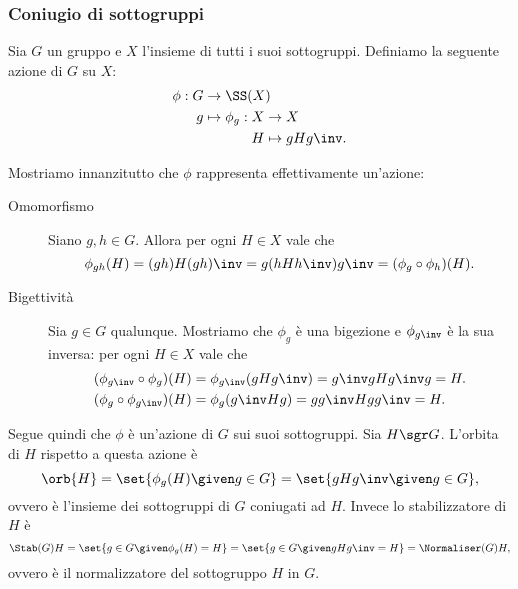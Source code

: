 \subsubsection{Coniugio di sottogruppi}
Sia $G$ un gruppo e $X$ l'insieme di tutti i suoi sottogruppi. Definiamo la seguente azione di $G$ su $X$:
\begin{align*}
    \phi : G &\to \SS(X)\\
           g &\mapsto 
    \begin{alignedat}[t]{1}
        \phi_g : X &\to X\\
                 H &\mapsto gHg\inv.
    \end{alignedat}
\end{align*}

Mostriamo innanzitutto che $\phi$ rappresenta effettivamente un'azione:
\begin{description}
    \item[Omomorfismo] Siano $g, h \in G$. Allora per ogni $H \in X$ vale che \[
        \phi_{gh}(H) = (gh)H(gh)\inv = g(hHh\inv)g\inv = (\phi_g \circ \phi_h)(H).
    \]
    \item[Bigettività] Sia $g \in G$ qualunque. Mostriamo che $\phi_g$ è una bigezione e $\phi_{g\inv}$ è la sua inversa: per ogni $H \in X$ vale che \begin{align*}
        &(\phi_{g\inv} \circ \phi_g)(H) = \phi_{g\inv}(gHg\inv) = g\inv gHg\inv g = H.\\
        &(\phi_{g} \circ \phi_{g\inv})(H) = \phi_{g}(g\inv Hg) = gg\inv Hgg\inv = H.
    \end{align*}
\end{description}

Segue quindi che $\phi$ è un'azione di $G$ sui suoi sottogruppi. Sia $H \sgr G$. L'orbita di $H$ rispetto a questa azione è \[
    \orb{H} = \set{\phi_g(H) \given g \in G} = \set{gHg\inv \given g \in G},
\] ovvero è l'insieme dei sottogruppi di $G$ coniugati ad $H$. Invece lo stabilizzatore di $H$ è \[
    \Stab(G){H} = \set{g \in G \given \phi_g(H) = H}
    = \set{g \in G \given gHg\inv = H} = \Normaliser(G){H},
\] ovvero è il normalizzatore del sottogruppo $H$ in $G$.

